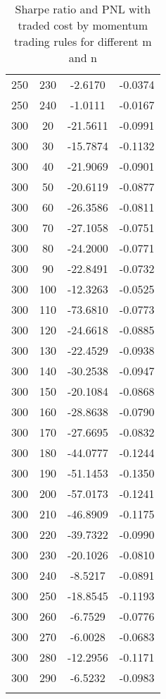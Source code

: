 \documentclass[11pt]{article}
\begin{document}
\begin{center}
\begin{longtable}{cccc}
    250 &   230 & -2.6170 & -0.0374 \\ 
    250 &   240 & -1.0111 & -0.0167 \\ 
    300 &    20 & -21.5611 & -0.0991 \\ 
    300 &    30 & -15.7874 & -0.1132 \\ 
    300 &    40 & -21.9069 & -0.0901 \\ 
    300 &    50 & -20.6119 & -0.0877 \\ 
    300 &    60 & -26.3586 & -0.0811 \\ 
    300 &    70 & -27.1058 & -0.0751 \\ 
    300 &    80 & -24.2000 & -0.0771 \\ 
    300 &    90 & -22.8491 & -0.0732 \\ 
    300 &   100 & -12.3263 & -0.0525 \\ 
    300 &   110 & -73.6810 & -0.0773 \\ 
    300 &   120 & -24.6618 & -0.0885 \\ 
    300 &   130 & -22.4529 & -0.0938 \\ 
    300 &   140 & -30.2538 & -0.0947 \\ 
    300 &   150 & -20.1084 & -0.0868 \\ 
    300 &   160 & -28.8638 & -0.0790 \\ 
    300 &   170 & -27.6695 & -0.0832 \\ 
    300 &   180 & -44.0777 & -0.1244 \\ 
    300 &   190 & -51.1453 & -0.1350 \\ 
    300 &   200 & -57.0173 & -0.1241 \\ 
    300 &   210 & -46.8909 & -0.1175 \\ 
    300 &   220 & -39.7322 & -0.0990 \\ 
    300 &   230 & -20.1026 & -0.0810 \\ 
    300 &   240 & -8.5217 & -0.0891 \\ 
    300 &   250 & -18.8545 & -0.1193 \\ 
    300 &   260 & -6.7529 & -0.0776 \\ 
    300 &   270 & -6.0028 & -0.0683 \\ 
    300 &   280 & -12.2956 & -0.1171 \\ 
    300 &   290 & -6.5232 & -0.0983 \\ 
   \hline
\caption{Sharpe ratio and PNL with traded cost by momentum trading rules for different m and n}\label{mom_tc}
\end{longtable}
\end{center}
\end{document}
